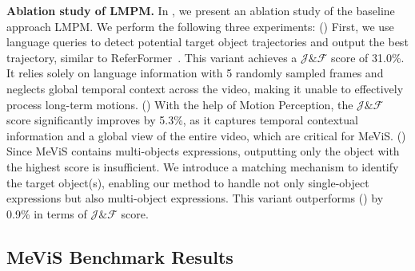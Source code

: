 \documentclass[10pt,twocolumn,letterpaper]{article}
\newcommand{\myparagraph}[1]{{\vspace{.5em} \noindent \bf #1}}
\newcommand{\ourdataset}{MeViS\xspace}
\newcommand{\ourmodel}{LMPM\xspace}
\begin{document}
\begin{table}[t]
   \renewcommand\arraystretch{1.06}
   \centering
   \small
   \caption{Ablation study of the baseline approach \ourmodel.}
  \vspace{-0.1in}
   \label{tab:TAM}\vspace{-5mm}
\end{table}



\myparagraph{Ablation study of \ourmodel.} 
In , we present an ablation study of the baseline approach \ourmodel. We perform the following three experiments:
() First, we use language queries to detect potential target object trajectories and output the best trajectory, similar to ReferFormer~\cite{wu2022referformer}. This variant achieves a $\mathcal{J\&F}$ score of 31.0\%. It relies solely on language information with 5 randomly sampled frames and neglects global temporal context across the video, making it unable to effectively process long-term motions. () With the help of Motion Perception, the $\mathcal{J\&F}$ score significantly improves by 5.3\%, as it captures temporal contextual information and a global view of the entire video, which are critical for \ourdataset. () Since \ourdataset contains multi-objects expressions, outputting only the object with the highest score is insufficient. We introduce a matching mechanism to identify the target object(s), enabling our method to handle not only single-object expressions but also multi-object expressions. This variant outperforms () by 0.9\% in terms of $\mathcal{J\&F}$ score.



\vspace{1mm}
\subsection{\ourdataset Benchmark Results}
\vspace{-2mm}
\end{document}
